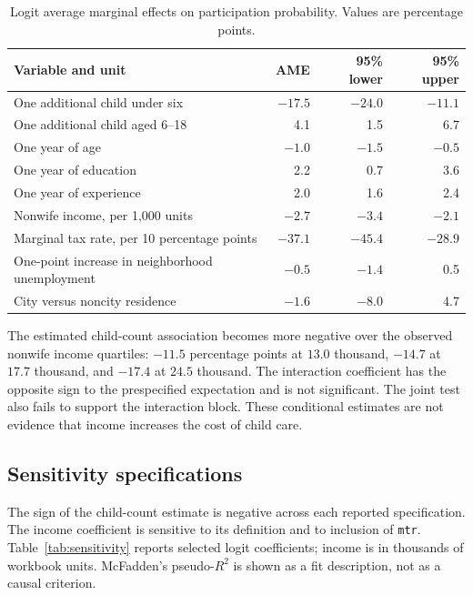 \documentclass[conference]{IEEEtran}
\begin{document}
\begin{table}[!t]
\centering
\caption{Logit average marginal effects on participation probability. Values are percentage points.}
\label{tab:ame}
\small
\begin{tabular}{lrrr}
\toprule
Variable and unit & AME & 95\% lower & 95\% upper \\
\midrule
One additional child under six & $-17.5$ & $-24.0$ & $-11.1$ \\
One additional child aged 6--18 & 4.1 & 1.5 & 6.7 \\
One year of age & $-1.0$ & $-1.5$ & $-0.5$ \\
One year of education & 2.2 & 0.7 & 3.6 \\
One year of experience & 2.0 & 1.6 & 2.4 \\
Nonwife income, per 1,000 units & $-2.7$ & $-3.4$ & $-2.1$ \\
Marginal tax rate, per 10 percentage points & $-37.1$ & $-45.4$ & $-28.9$ \\
One-point increase in neighborhood unemployment & $-0.5$ & $-1.4$ & 0.5 \\
City versus noncity residence & $-1.6$ & $-8.0$ & 4.7 \\
\bottomrule
\end{tabular}
\end{table}

The estimated child-count association becomes more negative over the observed nonwife income quartiles: $-11.5$ percentage points at $13.0$ thousand, $-14.7$ at $17.7$ thousand, and $-17.4$ at $24.5$ thousand. The interaction coefficient has the opposite sign to the prespecified expectation and is not significant. The joint test also fails to support the interaction block. These conditional estimates are not evidence that income increases the cost of child care.

\subsection{Sensitivity specifications}
The sign of the child-count estimate is negative across each reported specification. The income coefficient is sensitive to its definition and to inclusion of \texttt{mtr}. Table~\ref{tab:sensitivity} reports selected logit coefficients; income is in thousands of workbook units. McFadden's pseudo-$R^2$ is shown as a fit description, not as a causal criterion.
\end{document}
